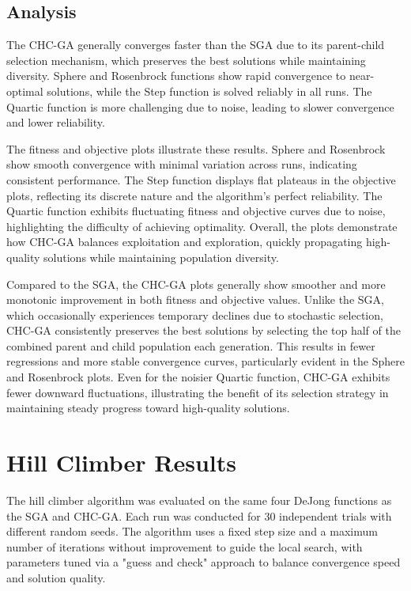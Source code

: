 \documentclass[11pt]{article}
\begin{document}
\subsection{Analysis}
The CHC-GA generally converges faster than the SGA due to its parent-child selection mechanism, which preserves the best solutions while maintaining diversity. Sphere and Rosenbrock functions show rapid convergence to near-optimal solutions, while the Step function is solved reliably in all runs. The Quartic function is more challenging due to noise, leading to slower convergence and lower reliability.  

The fitness and objective plots illustrate these results. Sphere and Rosenbrock show smooth convergence with minimal variation across runs, indicating consistent performance. The Step function displays flat plateaus in the objective plots, reflecting its discrete nature and the algorithm's perfect reliability. The Quartic function exhibits fluctuating fitness and objective curves due to noise, highlighting the difficulty of achieving optimality. Overall, the plots demonstrate how CHC-GA balances exploitation and exploration, quickly propagating high-quality solutions while maintaining population diversity.

Compared to the SGA, the CHC-GA plots generally show smoother and more monotonic improvement in both fitness and objective values. Unlike the SGA, which occasionally experiences temporary declines due to stochastic selection, CHC-GA consistently preserves the best solutions by selecting the top half of the combined parent and child population each generation. This results in fewer regressions and more stable convergence curves, particularly evident in the Sphere and Rosenbrock plots. Even for the noisier Quartic function, CHC-GA exhibits fewer downward fluctuations, illustrating the benefit of its selection strategy in maintaining steady progress toward high-quality solutions.

\section{Hill Climber Results}
\label{section-hillclimber-results}

The hill climber algorithm was evaluated on the same four DeJong functions as the SGA and CHC-GA. Each run was conducted for 30 independent trials with different random seeds. The algorithm uses a fixed step size and a maximum number of iterations without improvement to guide the local search, with parameters tuned via a "guess and check" approach to balance convergence speed and solution quality.
\end{document}
